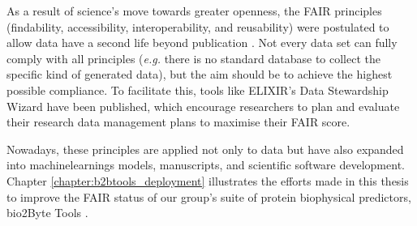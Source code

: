 As a result of science’s move towards greater openness, the FAIR principles (\Gls{findability}, \Gls{accessibility}, \Gls{interoperability}, and \Gls{reusability}) were postulated to allow data have a second life beyond publication \cite{jacobsen_fair_2020}. Not every data set can fully comply with all principles (\textit{e.g.} there is no standard database to collect the specific kind of generated data), but the aim should be to achieve the highest possible compliance. To facilitate this, tools like ELIXIR's Data Stewardship Wizard \cite{pergl_data_2019, devignes_experiences_2023} have been published, which encourage researchers to plan and evaluate their research data management plans to maximise their FAIR score.

Nowadays, these principles are applied not only to data but have also expanded into \glspl{machinelearning} models, manuscripts, and scientific software development. Chapter \ref{chapter:b2btools_deployment} illustrates the efforts made in this thesis to improve the FAIR status of our group's suite of protein biophysical predictors, bio2Byte Tools \cite{gavalda-garcia_bio2byte_2024}. 


